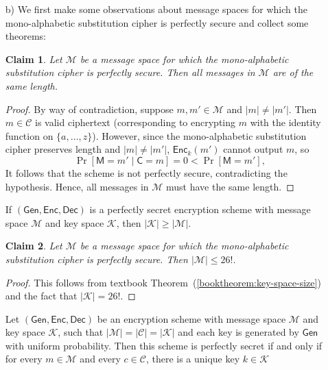 \documentclass[12pt]{article}
\numberwithin{equation}{section}
\theoremstyle{plain}
\newtheorem{claim}{Claim}
\newenvironment{booktheorem}[1]{%
\renewcommand\thebooktheoremX{#1}%
\booktheoremX
}{\endbooktheoremX}
\newcommand{\set}[1]{\{ #1 \}}
\DeclareMathOperator*{\prob}{Pr}
\newcommand{\given}{\mid}
\newcommand{\ctexts}{\mathcal{C}}
\newcommand{\ctext}{\algo{C}}
\newcommand{\ptexts}{\mathcal{M}}
\newcommand{\ptext}{\algo{M}}
\newcommand{\keys}{\mathcal{K}}
\newcommand{\algo}[1]{\mathsf{#1}}
\newcommand{\gen}{\algo{Gen}}
\newcommand{\enc}{\algo{Enc}}
\newcommand{\dec}{\algo{Dec}}
\begin{document}
\begin{enumerate}
    \item[b)] We first make some observations about message spaces
    for which the mono-alphabetic substitution cipher is perfectly secure
    and collect some theorems:
    \begin{claim}
    Let $\ptexts$ be a message space
    for which the mono-alphabetic substitution cipher is perfectly secure.
    Then all messages in $\ptexts$ are of the same length.
    \end{claim}
    \begin{proof}
    By way of contradiction, suppose $m, m' \in \ptexts$ and $|m| \neq |m'|$.
    Then $m \in \ctexts$ is valid ciphertext
    (corresponding to encrypting $m$ with the identity function on $\set{ a, \ldots, z }$).
    However, since the mono-alphabetic substitution cipher preserves length
    and $|m| \neq |m'|$,
    $\enc_k(m')$ cannot output $m$,
    so
    \begin{equation*}
        \prob[\ptext = m' \given \ctext = m] = 0 < \prob[\ptext = m'],
    \end{equation*}
    It follows that the scheme is not perfectly secure, contradicting the hypothesis.
    Hence, all messages in $\ptexts$ must have the same length.
    \end{proof}
    \begin{booktheorem}{2.10}\label{booktheorem:key-space-size}
    If $(\gen, \enc, \dec)$ is a perfectly secret encryption scheme with message space
    $\ptexts$ and key space $\keys$, then $|\keys| \geq |\ptexts|$.
    \end{booktheorem}
    \begin{claim}
    Let $\ptexts$ be a message space
    for which the mono-alphabetic substitution cipher is perfectly secure.
    Then $|\ptexts| \leq 26!$.
    \end{claim}
    \begin{proof}
    This follows from textbook Theorem~(\ref{booktheorem:key-space-size})
    and the fact that $|\keys| = 26!$.
    \end{proof}
    \begin{booktheorem}{2.11 (Shannon's theorem)}\label{booktheorem:shannon-theorem}
    Let $(\gen, \enc, \dec)$ be an encryption scheme with message space
    $\ptexts$ and key space $\keys$,
    such that $|\ptexts| = |\ctexts| = |\keys|$
    and each key is generated by $\gen$ with uniform probability.
    Then this scheme is perfectly secret if and only if
    for every $m \in \ptexts$ and every $c \in \ctexts$,
    there is a unique key $k \in \keys$

\end{booktheorem}
\end{enumerate}
\end{document}
